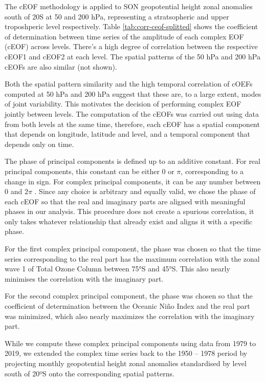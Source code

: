 \documentclass[smallextended]{svjour3}       %
\begin{document}
The cEOF methodology is applied to SON geopotential height zonal anomalies south of 20\degree S at 50 and 200 hPa, representing a stratsopheric and upper troposhperic level respectively.
Table \ref{tab:corr-ceof-splitted} shows the coefficient of determination between time series of the amplitude of each complex EOF (cEOF) across levels.
There's a high degree of correlation between the respective cEOF1 and cEOF2 at each level.
The spatial patterns of the 50 hPa and 200 hPa cEOFs are also similar (not shown).

Both the spatial pattern similarity and the high temporal correlation of cOEFs computed at 50 hPa and 200 hPa suggest that these are, to a large extent, modes of joint variability.
This motivates the decision of performing complex EOF jointly between levels.
The computation of the cEOFs was carried out using data from both levels at the same time, therefore, each cEOF has a spatial component that depends on longitude, latitude and level, and a temporal component that depends only on time.

The phase of principal components is defined up to an additive constant.
For real principal components, this constant can be either 0 or \(\pi\), corresponding to a change in sign.
For complex principal components, it can be any number between 0 and \(2\pi\) \citep{horel1984}.
Since any choice is arbitrary and equally valid, we chose the phase of each cEOF so that the real and imaginary parts are aligned with meaningful phases in our analysis.
This procedure does not create a spurious correlation, it only takes whatever relationship that already exist and aligns it with a specific phase.



For the first complex principal component, the phase was chosen so that the time series corresponding to the real part has the maximum correlation with the zonal wave 1 of Total Ozone Column between 75°S and 45°S.
This also nearly minimises the correlation with the imaginary part.

For the second complex principal component, the phase was chosen so that the coefficient of determination between the Oceanic Niño Index \citep{bamston1997} and the real part was minimized, which also nearly maximizes the correlation with the imaginary part.

While we compute these complex principal components using data from 1979 to 2019, we extended the complex time series back to the 1950 -- 1978 period by projecting monthly geopotential height zonal anomalies standardised by level south of 20ºS onto the corresponding spatial patterns.
\end{document}
